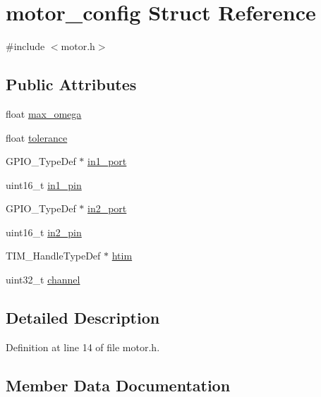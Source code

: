 \hypertarget{structmotor__config}{}\section{motor\+\_\+config Struct Reference}
\label{structmotor__config}


{\ttfamily \#include $<$motor.\+h$>$}

\subsection*{Public Attributes}
\begin{DoxyCompactItemize}
\item 
float \mbox{\hyperlink{structmotor__config_a88fc8ca47e3b231b22a03499cf7dc1c5}{max\+\_\+omega}}
\item 
float \mbox{\hyperlink{structmotor__config_a65896f970ca53f058d57ec2fc5188719}{tolerance}}
\item 
G\+P\+I\+O\+\_\+\+Type\+Def $\ast$ \mbox{\hyperlink{structmotor__config_a954fcd761395de38e251e7052126fe37}{in1\+\_\+port}}
\item 
uint16\+\_\+t \mbox{\hyperlink{structmotor__config_ab96ecf85a5bee0e13f1be1ac799ee24b}{in1\+\_\+pin}}
\item 
G\+P\+I\+O\+\_\+\+Type\+Def $\ast$ \mbox{\hyperlink{structmotor__config_a4b46a55de08e33e2e7a7f255568dfd7b}{in2\+\_\+port}}
\item 
uint16\+\_\+t \mbox{\hyperlink{structmotor__config_ab494f14e301a7553f90ffd25c0ccfe7f}{in2\+\_\+pin}}
\item 
T\+I\+M\+\_\+\+Handle\+Type\+Def $\ast$ \mbox{\hyperlink{structmotor__config_a9926810d168ac02bb71d8da15fbcd10d}{htim}}
\item 
uint32\+\_\+t \mbox{\hyperlink{structmotor__config_a59eeef5fc4909b5bdcc5f98cfd16378a}{channel}}
\end{DoxyCompactItemize}


\subsection{Detailed Description}


Definition at line 14 of file motor.\+h.



\subsection{Member Data Documentation}
\mbox{\label{structmotor__config_a59eeef5fc4909b5bdcc5f98cfd16378a}} 
